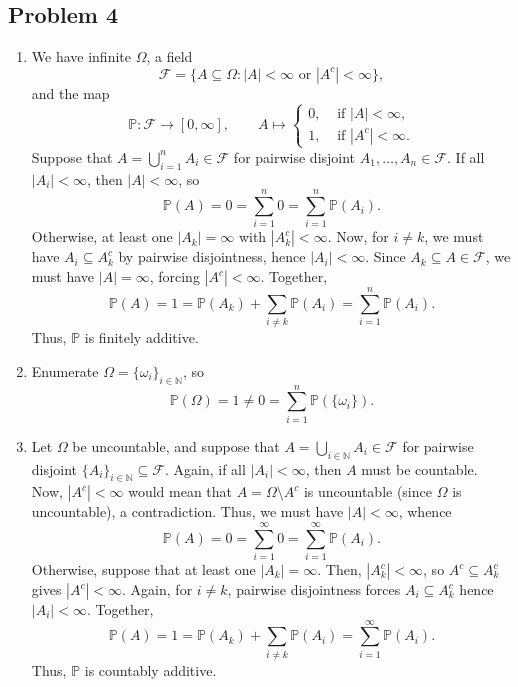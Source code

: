\documentclass[11pt]{article}
\newcommand{\N}{\mathbb{N}}
\begin{document}
    \subsection*{Problem 4}

    \begin{enumerate}
        \item We have infinite $\Omega$, a field \[
            \mathcal{F} = \{A \subseteq \Omega\colon |A| < \infty \text{ or } |A^c| < \infty\},
        \] and the map \[
            \mathbb{P}\colon \mathcal{F} \to [0, \infty], \qquad
            A \mapsto \begin{cases}
                0, &\text{ if } |A| < \infty, \\
                1, &\text{ if } |A^c| < \infty.
            \end{cases}
        \] Suppose that $A = \bigcup_{i = 1}^n A_i \in \mathcal{F}$ for
        pairwise disjoint $A_1, \dots, A_n \in \mathcal{F}$.
        If all $|A_i| < \infty$, then $|A| < \infty$, so \[
            \mathbb{P}(A) = 0 = \sum_{i = 1}^n 0 = \sum_{i = 1}^n \mathbb{P}(A_i).
        \] Otherwise, at least one $|A_k| = \infty$ with $|A_k^c| < \infty$.
        Now, for $i \neq k$, we must have $A_i \subseteq A_k^c$ by pairwise
        disjointness, hence $|A_i| < \infty$.
        Since $A_k \subseteq A \in \mathcal{F}$, we must have $|A| = \infty$,
        forcing $|A^c| < \infty$.
        Together, \[
            \mathbb{P}(A) = 1 = \mathbb{P}(A_k) + \sum_{i \neq k}
            \mathbb{P}(A_i) = \sum_{i = 1}^n \mathbb{P}(A_i).
        \] Thus, $\mathbb{P}$ is finitely additive.



        \item Enumerate $\Omega = \{\omega_i\}_{i \in \N}$, so \[
            \mathbb{P}(\Omega) = 1 \neq 0 = \sum_{i = 1}^n \mathbb{P}(\{\omega_i\}).
        \]


        \item Let $\Omega$ be uncountable, and suppose that $A = \bigcup_{i
        \in \N} A_i \in \mathcal{F}$ for pairwise disjoint $\{A_i\}_{i \in \N}
        \subseteq \mathcal{F}$.
        Again, if all $|A_i| < \infty$, then $A$ must be countable.
        Now, $|A^c| < \infty$ would mean that $A = \Omega\setminus A^c$ is
        uncountable (since $\Omega$ is uncountable), a contradiction.
        Thus, we must have $|A| < \infty$, whence \[
            \mathbb{P}(A) = 0 = \sum_{i = 1}^\infty 0 = \sum_{i = 1}^\infty \mathbb{P}(A_i).
        \] Otherwise, suppose that at least one $|A_k| = \infty$.
        Then, $|A_k^c| < \infty$, so $A^c \subseteq A_k^c$ gives $|A^c| <
        \infty$.
        Again, for $i \neq k$, pairwise disjointness forces $A_i \subseteq
        A_k^c$ hence $|A_i| < \infty$.
        Together, \[
            \mathbb{P}(A) = 1 = \mathbb{P}(A_k) + \sum_{i \neq k}
            \mathbb{P}(A_i) = \sum_{i = 1}^\infty \mathbb{P}(A_i).
        \] Thus, $\mathbb{P}$ is countably additive.



\end{enumerate}
\end{document}
